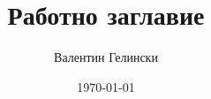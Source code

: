 \documentclass{beamer}
\title{Работно заглавие}
\author{Валентин Гелински}
\institute{ТУ София}
\date{\today}
\begin{document}
  \begin{frame} 
    \titlepage
  \end{frame}
\end{document}
